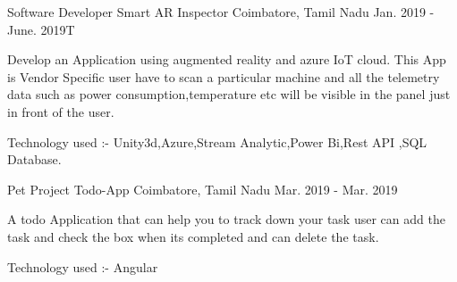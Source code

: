 


\begin{cventries}


   \cventry
    {Software Developer} %
    {{Smart AR Inspector}} %
    {Coimbatore, Tamil Nadu} %
    {Jan. 2019 - June. 2019T} %
    {
      \begin{cvitems} %
        \item {Develop an Application using augmented reality and azure IoT cloud. This App is Vendor Specific user have to \newline
        scan a particular machine and all the telemetry data such as power consumption,temperature etc will be visible \newline in the panel just in front of the user.}
        \item {Technology used :- Unity3d,Azure,Stream Analytic,Power Bi,Rest API ,SQL Database.}
      \end{cvitems}
    }


 \cventry
    {Pet Project} %
    {{Todo-App}} %
    {Coimbatore, Tamil Nadu} %
    {Mar. 2019 - Mar. 2019} %
    {
      \begin{cvitems} %
        \item {A todo Application that can help you to track down your task user can add the task and check the box \newline when its completed and can delete the task.}
        \item {Technology used :- Angular}
      \end{cvitems}
    }


\end{cventries}
